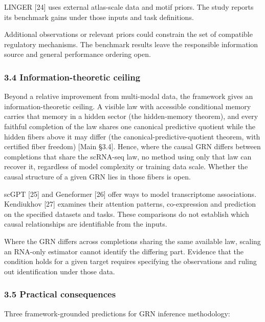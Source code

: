 \documentclass[
]{article}
\begin{document}
LINGER {[}24{]} uses external atlas-scale data and motif priors. The
study reports its benchmark gains under those inputs and task
definitions.

Additional observations or relevant priors could constrain the set of
compatible regulatory mechanisms. The benchmark results leave the
responsible information source and general performance ordering open.

\hypertarget{information-theoretic-ceiling}{%
\subsubsection{3.4 Information-theoretic
ceiling}\label{information-theoretic-ceiling}}

Beyond a relative improvement from multi-modal data, the framework gives
an information-theoretic ceiling. A visible law with accessible
conditional memory carries that memory in a hidden sector (the
hidden-memory theorem), and every faithful completion of the law shares
one canonical predictive quotient while the hidden fibers above it may
differ (the canonical-predictive-quotient theorem, with certified fiber
freedom) {[}Main §3.4{]}. Hence, where the causal GRN differs between
completions that share the scRNA-seq law, no method using only that law
can recover it, regardless of model complexity or training data scale.
Whether the causal structure of a given GRN lies in those fibers is
open.

scGPT {[}25{]} and Geneformer {[}26{]} offer ways to model transcriptome
associations. Kendiukhov {[}27{]} examines their attention patterns,
co-expression and prediction on the specified datasets and tasks. These
comparisons do not establish which causal relationships are identifiable
from the inputs.

Where the GRN differs across completions sharing the same available law,
scaling an RNA-only estimator cannot identify the differing part.
Evidence that the condition holds for a given target requires specifying
the observations and ruling out identification under those data.

\hypertarget{practical-consequences-1}{%
\subsubsection{3.5 Practical
consequences}\label{practical-consequences-1}}

Three framework-grounded predictions for GRN inference methodology:
\end{document}
